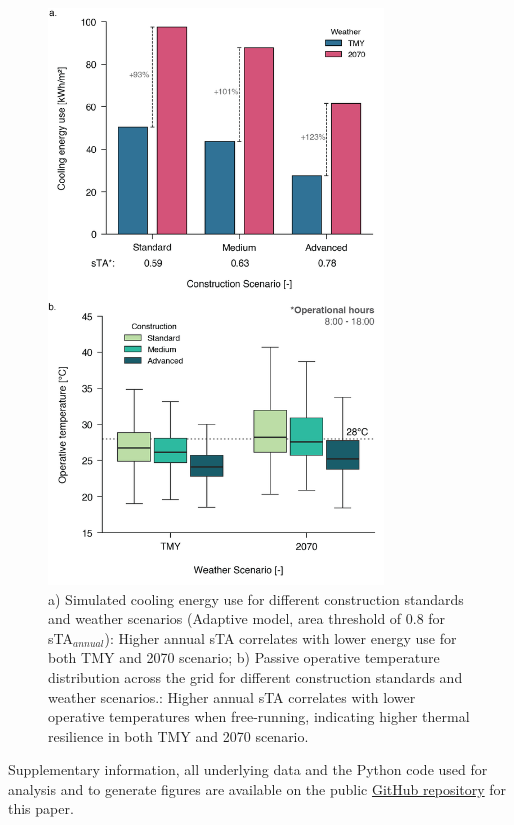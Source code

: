 \begin{figure}[h!]
    \centering
    \includegraphics[width=8.9cm]{manuscript/src/figures/energy-passive-design.png}
    \caption{a) Simulated cooling energy use for different construction standards and weather scenarios (Adaptive model, area threshold of 0.8 for sTA$_{annual}$): Higher annual sTA correlates with lower energy use for both TMY and 2070 scenario; b) Passive operative temperature distribution across the grid for different construction standards and weather scenarios.: Higher annual sTA correlates with lower operative temperatures when free-running, indicating higher thermal resilience in both TMY and 2070 scenario.}
    \label{fig:energy-passive-design}
\end{figure}

Supplementary information, all underlying data and the Python code used for analysis and to generate figures are available on the public \href{https://github.com/t-kramer/2024-paper-conference-cate}{GitHub repository} for this paper.
